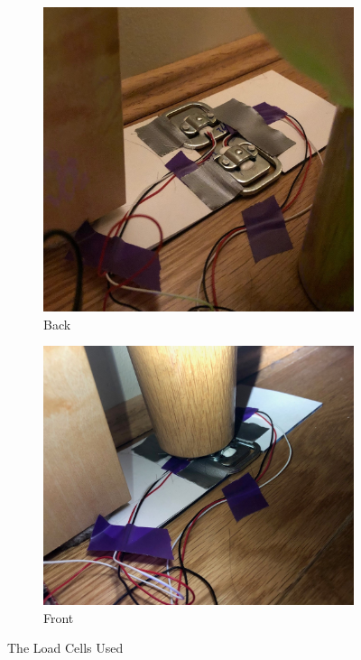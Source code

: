 \documentclass[11pt]{article}
\begin{document}
\begin{figure}[H]
	\centering
	\begin{subfigure}[]{0.4\textwidth}
		\centering
		\includegraphics{unloadedCells}
		\caption{Back}
	\end{subfigure}
	\hfill
	\begin{subfigure}[]{0.4\textwidth}
		\centering
		\includegraphics{ loadedCells}
		\caption{Front}
	\end{subfigure}
	\caption{The Load Cells Used}
	\label{fig:mechmount}
\end{figure}
\end{document}
